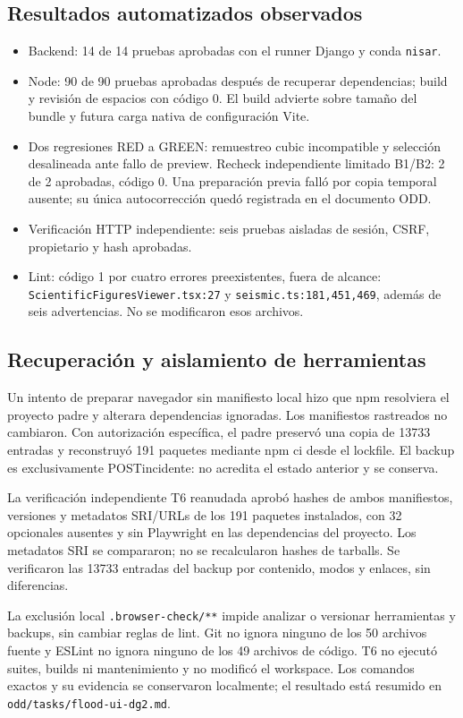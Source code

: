 \documentclass{article}
\begin{document}
\subsection{Resultados automatizados observados}
\begin{itemize}
\item Backend: 14 de 14 pruebas aprobadas con el runner Django y conda \texttt{nisar}.
\item Node: 90 de 90 pruebas aprobadas después de recuperar dependencias; build y revisión de espacios con código 0. El build advierte sobre tamaño del bundle y futura carga nativa de configuración Vite.
\item Dos regresiones RED a GREEN: remuestreo cubic incompatible y selección desalineada ante fallo de preview. Recheck independiente limitado B1/B2: 2 de 2 aprobadas, código 0. Una preparación previa falló por copia temporal ausente; su única autocorrección quedó registrada en el documento ODD.
\item Verificación HTTP independiente: seis pruebas aisladas de sesión, CSRF, propietario y hash aprobadas.
\item Lint: código 1 por cuatro errores preexistentes, fuera de alcance: \texttt{ScientificFiguresViewer.tsx:27} y \texttt{seismic.ts:181,451,469}, además de seis advertencias. No se modificaron esos archivos.
\end{itemize}

\subsection{Recuperación y aislamiento de herramientas}
Un intento de preparar navegador sin manifiesto local hizo que npm resolviera el proyecto padre y alterara dependencias ignoradas. Los manifiestos rastreados no cambiaron. Con autorización específica, el padre preservó una copia de 13733 entradas y reconstruyó 191 paquetes mediante npm ci desde el lockfile. El backup es exclusivamente POSTincidente: no acredita el estado anterior y se conserva.

La verificación independiente T6 reanudada aprobó hashes de ambos manifiestos, versiones y metadatos SRI/URLs de los 191 paquetes instalados, con 32 opcionales ausentes y sin Playwright en las dependencias del proyecto. Los metadatos SRI se compararon; no se recalcularon hashes de tarballs. Se verificaron las 13733 entradas del backup por contenido, modos y enlaces, sin diferencias.

La exclusión local \texttt{.browser-check/**} impide analizar o versionar herramientas y backups, sin cambiar reglas de lint. Git no ignora ninguno de los 50 archivos fuente y ESLint no ignora ninguno de los 49 archivos de código. T6 no ejecutó suites, builds ni mantenimiento y no modificó el workspace. Los comandos exactos y su evidencia se conservaron localmente; el resultado está resumido en \texttt{odd/tasks/flood-ui-dg2.md}.
\end{document}
